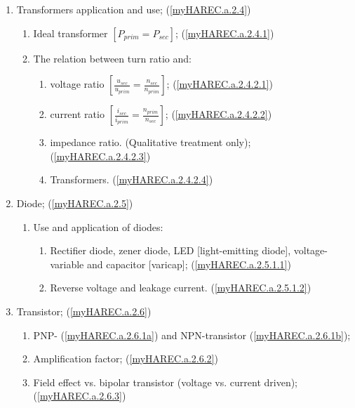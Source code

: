 \begin{enumerate}
\begin{enumerate}[noitemsep]
\begin{enumerate}[noitemsep]
\end{enumerate}
\item Transformers application and use; (\ref{myHAREC.a.2.4})\label{HAREC.a.2.4}
\begin{enumerate}[noitemsep]
\item Ideal transformer \(\left[P_{prim} = P_{sec}\right]\); (\ref{myHAREC.a.2.4.1})\label{HAREC.a.2.4.1}
\item The relation between turn ratio and:
\begin{enumerate}[noitemsep]
\item voltage ratio \(\left[\frac{u_{sec}}{u_{prim}} = \frac{n_{sec}}{n_{prim}}\right]\); (\ref{myHAREC.a.2.4.2.1})\label{HAREC.a.2.4.2.1}
\item current ratio \(\left[\frac{i_{sec}}{i_{prim}} = \frac{n_{prim}}{n_{sec}}\right]\); (\ref{myHAREC.a.2.4.2.2})\label{HAREC.a.2.4.2.2}
\item impedance ratio. (Qualitative treatment only); (\ref{myHAREC.a.2.4.2.3})\label{HAREC.a.2.4.2.3}
\item Transformers. (\ref{myHAREC.a.2.4.2.4})\label{HAREC.a.2.4.2.4}
\end{enumerate}
\end{enumerate}
\item Diode; (\ref{myHAREC.a.2.5})\label{HAREC.a.2.5}
\begin{enumerate}[noitemsep]
\item Use and application of diodes:
\begin{enumerate}[noitemsep]
\item Rectifier diode, zener diode, LED [light-emitting diode], voltage-variable and capacitor [varicap]; (\ref{myHAREC.a.2.5.1.1})\label{HAREC.a.2.5.1.1}
\item Reverse voltage and leakage current. (\ref{myHAREC.a.2.5.1.2})\label{HAREC.a.2.5.1.2}
\end{enumerate}
\end{enumerate}
\item Transistor; (\ref{myHAREC.a.2.6})\label{HAREC.a.2.6}
\begin{enumerate}[noitemsep]
\item PNP- (\ref{myHAREC.a.2.6.1a})\label{HAREC.a.2.6.1a} and NPN-transistor (\ref{myHAREC.a.2.6.1b})\label{HAREC.a.2.6.1b};
\item Amplification factor; (\ref{myHAREC.a.2.6.2})\label{HAREC.a.2.6.2}
\item Field effect vs. bipolar transistor (voltage vs. current driven); (\ref{myHAREC.a.2.6.3})\label{HAREC.a.2.6.3}

\end{enumerate}
\end{enumerate}
\end{enumerate}
